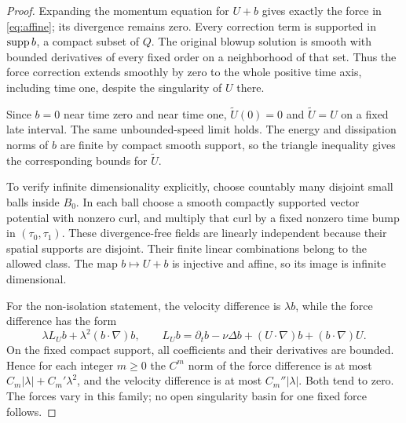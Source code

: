 \begin{proof}
Expanding the momentum equation for $U+b$ gives exactly the force in
\eqref{eq:affine}; its divergence remains zero. Every correction term is supported in $\operatorname{supp} b$, a compact subset of $Q$. The original blowup solution is smooth with bounded derivatives of every fixed order on a neighborhood of that set. Thus the force correction extends smoothly by zero to the whole positive time axis, including time one, despite the singularity of $U$ there.

Since $b=0$ near time zero and near time one,
$\widetilde U(0)=0$ and $\widetilde U=U$ on a fixed late interval.
The same unbounded-speed limit holds. The energy and dissipation norms of $b$ are finite by compact smooth support, so the triangle inequality gives the corresponding bounds for $\widetilde U$.

To verify infinite dimensionality explicitly, choose countably many disjoint small balls inside $B_0$. In each ball choose a smooth compactly supported vector potential with nonzero curl, and multiply that curl by a fixed nonzero time bump in $(\tau_0,\tau_1)$. These divergence-free fields are linearly independent because their spatial supports are disjoint. Their finite linear combinations belong to the allowed class. The map $b\mapsto U+b$ is injective and affine, so its image is infinite dimensional.

For the non-isolation statement, the velocity difference is $\lambda b$, while the force difference has the form
\[
 \lambda L_U b+\lambda^2(b\cdot\nabla)b,\qquad
 L_Ub=\partial_tb-\nu\Delta b+(U\cdot\nabla)b+(b\cdot\nabla)U.
\]
On the fixed compact support, all coefficients and their derivatives are bounded. Hence for each integer $m\ge0$ the $C^m$ norm of the force difference is at most $C_m|\lambda|+C_m'\lambda^2$, and the velocity difference is at most $C_m''|\lambda|$. Both tend to zero. The forces vary in this family; no open singularity basin for one fixed force follows.
\end{proof}

